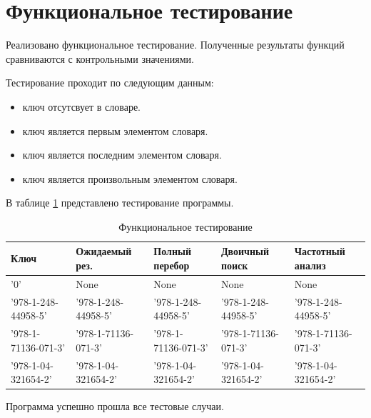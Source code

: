 \documentclass[12pt]{report}
\begin{document}
\section{Функциональное тестирование}

Реализовано функциональное тестирование. Полученные результаты функций сравниваются с контрольными значениями.

Тестирование проходит по следующим данным:
\begin{itemize}
	\item ключ отсутсвует в словаре.
	\item ключ является первым элементом словаря.
	\item ключ является последним элементом словаря.
	\item ключ является произвольным элементом словаря.
\end{itemize}

В таблице \ref{tab1} представлено тестирование программы.

\newpage
\begin{table}
	\caption{Функциональное тестирование}
	\label{tab1}
	\begin{center}
		\begin{tabular}{ | p{30mm} | p{30mm} | p{30mm} | p{30mm} | p{30mm}|}
			\hline
			\textbf{Ключ} & \textbf{Ожидаемый рез.} & \textbf{Полный перебор} & \textbf{Двоичный поиск} & \textbf{Частотный анализ} \\ \hline
			'0' & 
			None &
			None &
			None &
			None  \\ \hline
			
			'978-1-248-44958-5' & 
			'978-1-248-44958-5' &
			'978-1-248-44958-5' &
			'978-1-248-44958-5' &
			'978-1-248-44958-5'  \\ \hline	
			
			'978-1-71136-071-3' &
			'978-1-71136-071-3' &
			'978-1-71136-071-3' &
			'978-1-71136-071-3' &
			'978-1-71136-071-3'  \\ \hline	
			
			'978-1-04-321654-2' &
			'978-1-04-321654-2' &
			'978-1-04-321654-2' &
			'978-1-04-321654-2' &
			'978-1-04-321654-2'  \\ \hline	
			
		\end{tabular}
		\end{center}
		
		\hfill
		
\end{table}	

Программа успешно прошла все тестовые случаи.
\end{document}
